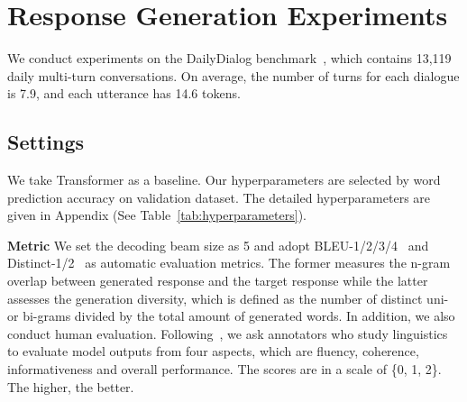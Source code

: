 \documentclass[11pt,a4paper]{article}
\begin{document}
\section{Response Generation Experiments}
We conduct experiments on the DailyDialog
benchmark~\cite{li-etal-2017-dailydialog}, which contains 13,119 daily multi-turn conversations.
On average, the number of turns for each dialogue is 7.9, and each utterance has 14.6 tokens.
\subsection{Settings}


We take Transformer as a baseline.
Our hyperparameters are selected by word prediction accuracy on validation dataset.
The detailed hyperparameters are given in Appendix (See Table~\ref{tab:hyperparameters}).

\noindent\textbf{Metric} We set the decoding beam size as 5 and adopt BLEU-1/2/3/4~\cite{papineni-etal-2002-bleu} and Distinct-1/2~\cite{li-etal-2016-diversity} as automatic evaluation metrics. 
The former measures the n-gram overlap between generated response and the target response while the latter assesses the generation diversity, which is defined as the number of distinct uni- or bi-grams divided by the total amount of generated words.
In addition, we also conduct human evaluation.
Following~\citet{bao-etal-2020-plato}, we ask annotators who study linguistics to evaluate model outputs from four aspects, which are fluency, coherence, informativeness and overall performance.
The scores are in a scale of \{0, 1, 2\}.
The higher, the better.
\end{document}
